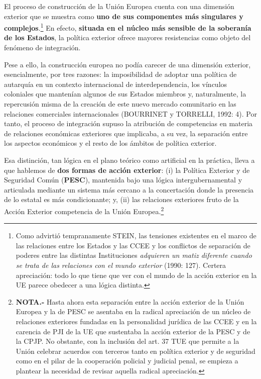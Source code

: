 \documentclass[10pt,a4paper]{article}
\begin{document}
El proceso de construcción de la Unión Europea cuenta con una dimensión exterior que se muestra como \textbf{uno de sus componentes más singulares y complejos}.\footnote{%
    Como advirtió tempranamente STEIN, las tensiones existentes en el marco de las relaciones entre los Estados y las CCEE y los conflictos de separación de poderes entre las distintas Instituciones \textit{adquieren un matiz diferente cuando se trata de las relaciones con el mundo exterior} (1990: 127). Certera apreciación: todo lo que tiene que ver con el mundo de la acción exterior en la UE parece obedecer a una lógica distinta.
} En efecto, \textbf{situada en el núcleo más sensible de la soberanía de los Estados}, la política exterior ofrece mayores resistencias como objeto del fenómeno de integración. 

Pese a ello, la construcción europea no podía carecer de una dimensión exterior, esencialmente, por tres razones: la imposibilidad de adoptar una política de autarquía en un contexto internacional de interdependencia, los vínculos coloniales que mantenían algunos de sus Estados miembros y, naturalmente, la repercusión misma de la creación de este nuevo mercado comunitario en las relaciones comerciales internacionales (BOURRINET y TORRELLI, 1992: 4). Por tanto, el proceso de integración supuso la atribución de competencias en materia de relaciones económicas exteriores que implicaba, a su vez, la separación entre los aspectos económicos y el resto de los ámbitos de política exterior. 

Esa distinción, tan lógica en el plano teórico como artificial en la práctica, lleva a que hablemos de \textbf{dos formas de acción exterior}: (i) la Política Exterior y de Seguridad Común (\textbf{PESC}), mantenida bajo una lógica intergubernamental y articulada mediante un sistema más cercano a la concertación donde la presencia de lo estatal es más condicionante; y, (ii) las relaciones exteriores fruto de la Acción Exterior competencia de la Unión Europea.\footnote{%
    \textbf{NOTA.-} Hasta ahora esta separación entre la acción exterior de la Unión Europea y la de PESC se asentaba en la radical apreciación de un núcleo de relaciones exteriores fundadas en la personalidad jurídica de las CCEE y en la carencia de PJI de la UE que sustentaba la acción exterior de la PESC y de la CPJP. No obstante, con la inclusión del art. 37 TUE que permite a la Unión celebrar acuerdos con terceros tanto en política exterior y de seguridad como en el pilar de la cooperación policial y judicial penal, se empieza a plantear la necesidad de revisar aquella radical apreciación.
} 
\end{document}
